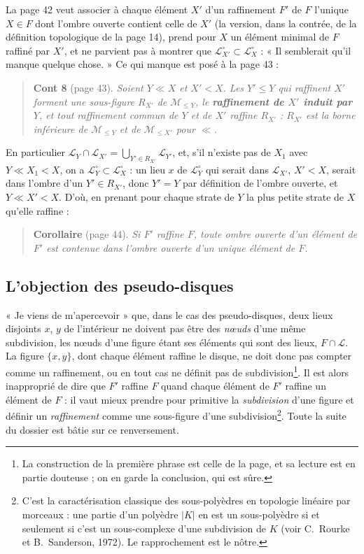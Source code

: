 \documentclass[11pt,a4paper]{article}
\begin{document}
La page 42 veut associer à chaque élément $X'$ d'un raffinement $F'$ de $F$
l'unique $X \in F$ dont l'ombre ouverte contient celle de $X'$ (la version,
dans la contrée, de la définition topologique de la page 14), prend pour
$X$ un élément minimal de $F$ raffiné par $X'$, et ne parvient pas à montrer
que $\mathcal{L}^{\circ}_{X'} \subset \mathcal{L}^{\circ}_{X}$ : « Il semblerait
qu'il manque quelque chose. » Ce qui manque est posé à la page 43 :

\begin{quote}
\textbf{Cont 8} (page 43). \emph{Soient $Y \ll X$ et $X' < X$. Les $Y' \leq Y$
qui raffinent $X'$ forment une sous-figure $R_{X'}$ de $\mathcal{M}_{\leq Y}$,
le \textbf{raffinement de $X'$ induit par $Y$}, et tout raffinement commun de
$Y$ et de $X'$ raffine $R_{X'}$ : $R_{X'}$ est la borne inférieure de
$\mathcal{M}_{\leq Y}$ et de $\mathcal{M}_{\leq X'}$ pour $\ll$.}
\end{quote}

En particulier $\mathcal{L}_{Y} \cap \mathcal{L}_{X'} = \bigcup_{Y' \in R_{X'}}
\mathcal{L}_{Y'}$, et, s'il n'existe pas de $X_{1}$ avec $Y \ll X_{1} < X$, on
a $\mathcal{L}^{\circ}_{Y} \subset \mathcal{L}^{\circ}_{X}$ : un lieu $x$ de
$\mathcal{L}^{\circ}_{Y}$ qui serait dans $\mathcal{L}_{X'}$, $X' < X$, serait
dans l'ombre d'un $Y' \in R_{X'}$, donc $Y' = Y$ par définition de l'ombre
ouverte, et $Y \ll X' < X$. D'où, en prenant pour chaque strate de $Y$ la plus
petite strate de $X$ qu'elle raffine :

\begin{quote}
\textbf{Corollaire} (page 44). \emph{Si $F'$ raffine $F$, toute ombre ouverte
d'un élément de $F'$ est contenue dans l'ombre ouverte d'un unique élément de
$F$.}
\end{quote}

\subsection*{L'objection des pseudo-disques}

« Je viens de m'apercevoir » que, dans le cas des pseudo-disques, deux lieux
disjoints $x$, $y$ de l'intérieur ne doivent pas être des \emph{nœuds} d'une
même subdivision, les nœuds d'une figure étant ses éléments qui sont des
lieux, $F \cap \mathcal{L}$. La figure $\{x, y\}$, dont chaque élément raffine
le disque, ne doit donc pas compter comme un raffinement, ou en tout cas ne
définit pas de subdivision\footnote{La construction de la première phrase est
celle de la page, et sa lecture est en partie douteuse ; on en garde la
conclusion, qui est sûre.}. Il est alors inapproprié de dire que $F'$ raffine
$F$ quand chaque élément de $F'$ raffine un élément de $F$ : il vaut mieux
prendre pour primitive la \emph{subdivision} d'une figure et définir un
\emph{raffinement} comme une sous-figure d'une subdivision\footnote{C'est la
caractérisation classique des sous-polyèdres en topologie linéaire par morceaux
: une partie d'un polyèdre $|K|$ en est un sous-polyèdre si et seulement si
c'est un sous-complexe d'une subdivision de $K$ (voir C.~Rourke et
B.~Sanderson, 1972). Le rapprochement est le nôtre.}. Toute la suite du dossier
est bâtie sur ce renversement.
\end{document}
